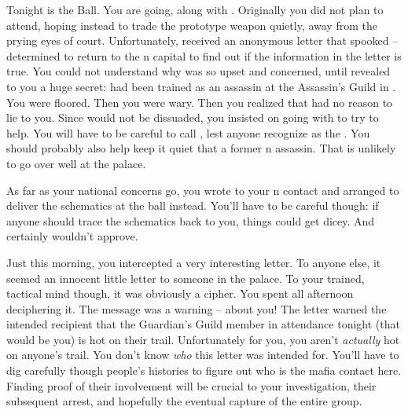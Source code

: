 \documentclass[char]{NeptuneBall}
\begin{document}
Tonight is the \cExExKing{} Ball. You are going, along with \cQueen{}. Originally you did not plan to attend, hoping instead to trade  the prototype weapon quietly, away from the prying eyes of court. Unfortunately, \cQueen{} received an anonymous letter that spooked \cQueen{\them} -- \cQueen{\they} \cQueen{\are} determined to return to the \pAtlantis{}n capital to find out if the information in the letter is true. You could not understand why \cQueen{} was so upset and concerned, until \cQueen{\they} revealed to you a huge secret: \cQueen{} had been trained as an assassin at the Assassin's Guild in \pPacifica{}. You were floored. Then you were wary. Then you realized that \cQueen{} had no reason to lie to you. Since \cQueen{\they} would not be dissuaded, you insisted on going with \cQueen{\them} to try to help. You will have to be careful to call \cQueen{\them} \cQueen{\MYname}, lest anyone recognize \cQueen{\them} as the \cQueen{\King}. You should probably also help keep it quiet that \cQueen{\they} \cQueen{\are} a former \pPacifica{}n assassin. That is unlikely to go over well at the palace.

As far as your national concerns go, you wrote to your \pPacifica{}n contact and arranged to deliver the schematics at the ball instead. You'll have to be careful though: if anyone should trace the schematics back to you, things could get dicey. And \cQueen{} certainly wouldn't approve.

Just this morning, you intercepted a very interesting letter. To anyone else, it seemed an innocent little letter to someone in the palace. To your trained, tactical mind though, it was obviously a cipher. You spent all afternoon deciphering it. The message was a warning -- about you! The letter warned the intended recipient that the Guardian's Guild member in attendance tonight (that would be you) is hot on their trail. Unfortunately for you, you aren't \emph{actually} hot on anyone's trail. You don't know \emph{who} this letter was intended for. You'll have to dig carefully though people's histories to figure out who is the mafia contact here. Finding proof of their involvement will be crucial to your investigation, their subsequent arrest, and hopefully the eventual capture of the entire group.
\end{document}
